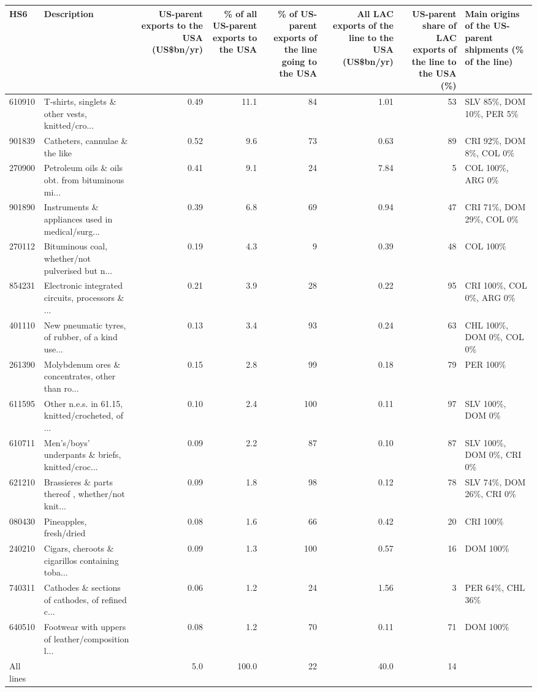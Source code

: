\begin{tabular}{llrrrrrl}
\toprule
HS6 & Description & \multicolumn{1}{p{1.7cm}}{\raggedright US-parent exports to the USA (US\$bn/yr)} & \multicolumn{1}{p{1.7cm}}{\raggedright \% of all US-parent exports to the USA} & \multicolumn{1}{p{2.0cm}}{\raggedright \% of US-parent exports of the line going to the USA} & \multicolumn{1}{p{1.9cm}}{\raggedright All LAC exports of the line to the USA (US\$bn/yr)} & \multicolumn{1}{p{2.2cm}}{\raggedright US-parent share of LAC exports of the line to the USA (\%)} & \multicolumn{1}{p{2.6cm}}{\raggedright Main origins of the US-parent shipments (\% of the line)} \\
\midrule
610910 & T-shirts, singlets \& other vests, knitted/cro... & 0.49 & 11.1 & 84 & 1.01 & 53 & SLV 85\%, DOM 10\%, PER 5\% \\
901839 & Catheters, cannulae \& the like & 0.52 & 9.6 & 73 & 0.63 & 89 & CRI 92\%, DOM 8\%, COL 0\% \\
270900 & Petroleum oils \& oils obt. from bituminous mi... & 0.41 & 9.1 & 24 & 7.84 & 5 & COL 100\%, ARG 0\% \\
901890 & Instruments \& appliances used in medical/surg... & 0.39 & 6.8 & 69 & 0.94 & 47 & CRI 71\%, DOM 29\%, COL 0\% \\
270112 & Bituminous coal, whether/not pulverised but n... & 0.19 & 4.3 & 9 & 0.39 & 48 & COL 100\% \\
854231 & Electronic integrated circuits, processors \& ... & 0.21 & 3.9 & 28 & 0.22 & 95 & CRI 100\%, COL 0\%, ARG 0\% \\
401110 & New pneumatic tyres, of rubber, of a kind use... & 0.13 & 3.4 & 93 & 0.24 & 63 & CHL 100\%, DOM 0\%, COL 0\% \\
261390 & Molybdenum ores \& concentrates, other than ro... & 0.15 & 2.8 & 99 & 0.18 & 79 & PER 100\% \\
611595 & Other n.e.s. in 61.15, knitted/crocheted, of ... & 0.10 & 2.4 & 100 & 0.11 & 97 & SLV 100\%, DOM 0\% \\
610711 & Men's/boys' underpants \& briefs, knitted/croc... & 0.09 & 2.2 & 87 & 0.10 & 87 & SLV 100\%, DOM 0\%, CRI 0\% \\
621210 & Brassieres \& parts thereof , whether/not knit... & 0.09 & 1.8 & 98 & 0.12 & 78 & SLV 74\%, DOM 26\%, CRI 0\% \\
080430 & Pineapples, fresh/dried & 0.08 & 1.6 & 66 & 0.42 & 20 & CRI 100\% \\
240210 & Cigars, cheroots \& cigarillos containing toba... & 0.09 & 1.3 & 100 & 0.57 & 16 & DOM 100\% \\
740311 & Cathodes \& sections of cathodes, of refined c... & 0.06 & 1.2 & 24 & 1.56 & 3 & PER 64\%, CHL 36\% \\
640510 & Footwear with uppers of leather/composition l... & 0.08 & 1.2 & 70 & 0.11 & 71 & DOM 100\% \\
\midrule
All lines & & 5.0 & 100.0 & 22 & 40.0 & 14 & \\
\bottomrule
\end{tabular}
